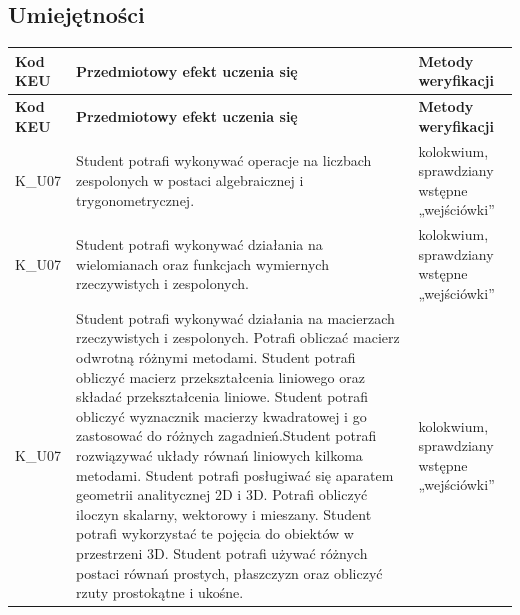\documentclass[12pt, a4paper]{article}
\newcommand{\thdrule}{\noalign{\global\setlength{\extrarowheight}{0pt}}}
\newcommand{\thdend}{\noalign{\global\setlength{\extrarowheight}{3pt}}}
\begin{document}
\subsection*{Umiejętności}
{\scriptsize
\begin{longtable}{m{1.6cm}m{9.0cm}m{4.2cm}}
\thdrule\toprule
\rowcolor{pjatkRed} {\color{white}\footnotesize\textbf{\vphantom{Ag}Kod KEU}} & {\color{white}\footnotesize\textbf{\vphantom{Ag}Przedmiotowy efekt uczenia się}} & {\color{white}\footnotesize\textbf{\vphantom{Ag}Metody weryfikacji}} \\
\midrule\thdend
\endfirsthead
\thdrule\toprule
\rowcolor{pjatkRed} {\color{white}\footnotesize\textbf{\vphantom{Ag}Kod KEU}} & {\color{white}\footnotesize\textbf{\vphantom{Ag}Przedmiotowy efekt uczenia się}} & {\color{white}\footnotesize\textbf{\vphantom{Ag}Metody weryfikacji}} \\
\midrule\thdend
\endhead
  \rowcolor{tableRowLight} K\_U07 & Student potrafi wykonywać operacje na liczbach zespolonych w postaci algebraicznej i trygonometrycznej. & kolokwium, sprawdziany wstępne „wejściówki'' \\
  \rowcolor{tableRowAlt} K\_U07 & Student potrafi wykonywać działania na wielomianach oraz funkcjach wymiernych rzeczywistych i zespolonych. & kolokwium, sprawdziany wstępne „wejściówki'' \\
  \rowcolor{tableRowLight} K\_U07 & Student potrafi wykonywać działania na macierzach rzeczywistych i zespolonych. Potrafi obliczać macierz odwrotną różnymi metodami. Student potrafi obliczyć macierz przekształcenia liniowego oraz składać przekształcenia liniowe. Student potrafi obliczyć wyznacznik macierzy kwadratowej i go zastosować do różnych zagadnień.Student potrafi rozwiązywać układy równań liniowych kilkoma metodami. Student potrafi  posługiwać się aparatem geometrii analitycznej 2D i 3D. Potrafi obliczyć iloczyn skalarny, wektorowy i mieszany. Student potrafi wykorzystać te pojęcia do obiektów w przestrzeni 3D. Student potrafi używać różnych postaci równań prostych, płaszczyzn oraz obliczyć rzuty prostokątne i ukośne. & kolokwium, sprawdziany wstępne „wejściówki'' \\
\bottomrule
\end{longtable}}
\end{document}
